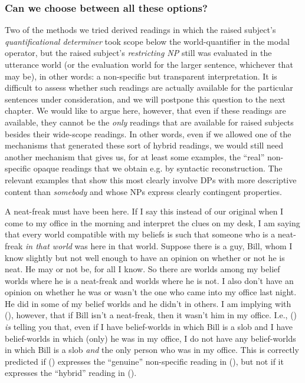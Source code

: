 \subsubsection{Can we choose between all these options?}\label{semrec}

Two of the methods we tried derived readings in which the raised subject's
\emph{quantificational determiner} took scope below the world-quantifier in the
modal operator, but the raised subject's \emph{restricting NP} still was
evaluated in the utterance world (or the evaluation world for the larger
sentence, whichever that may be), in other words: a non-specific but transparent
interpretation. It is difficult to assess whether such readings are actually
available for the particular sentences under consideration, and we will postpone
this question to the next chapter. We would like to argue here, however, that
even if these readings are available, they cannot be the \emph{only} readings
that are available for raised subjects besides their wide-scope readings. In
other words, even if we allowed one of the mechanisms that generated these sort
of hybrid readings, we would still need another mechanism that gives us, for at
least some examples, the ``real'' non-specific opaque readings that we obtain
e.g. by syntactic reconstruction. The relevant examples that show this most
clearly involve DPs with more descriptive content than \emph{somebody} and whose
NPs express clearly contingent properties.

\ex A neat-freak must have been here. \xe
%
If I say this instead of our original  when I
come to my office in the morning and interpret the clues on my desk, I am saying
that every world compatible with my beliefs is such that someone who is a
neat-freak \emph{in that world} was here in that world. Suppose there is a guy,
Bill, whom I know slightly but not well enough to have an opinion on whether or
not he is neat. He may or not be, for all I know. So there are worlds among my
belief worlds where he is a neat-freak and worlds where he is not. I also don't
have an opinion on whether he was or wasn't the one who came into my office last
night. He did in some of my belief worlds and he didn't in others. I am implying
with (\lastx), however, that if Bill isn't a neat-freak, then it wasn't him in
my office. I.e., (\lastx) \emph{is} telling you that, even if I have
belief-worlds in which Bill is a slob and I have belief-worlds in which (only)
he was in my office, I do not have any belief-worlds in which Bill is a slob
\emph{and} the only person who was in my office. This is correctly predicted if
(\lastx) expresses the ``genuine'' non-specific reading in (\nextx), but not if
it expresses the ``hybrid'' reading in (\anextx).

